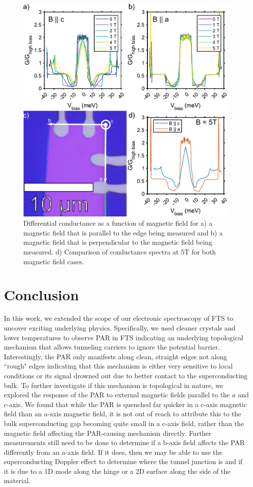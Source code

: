 \begin{figure}
    \centering
    \includegraphics[width = \textwidth]{Chap4/Figures/MagneticField.pdf}
    \caption{Differential conductance as a function of magnetic field for a) a magnetic field that is parallel to the edge being measured and b) a magnetic field that is perpendicular to the magnetic field being measured. d) Comparison of conductance spectra at 5T for both magnetic field cases.}
    \label{fig:PARField}
\end{figure}
\section{Conclusion}
In this work, we extended the scope of our electronic spectroscopy of \ac{FTS} to uncover exciting underlying physics. Specifically, we used cleaner crystals and lower temperatures to observe \acl{PAR} in \ac{FTS} indicating an underlying topological mechanism that allows tunneling carriers to ignore the potential barrier. Interestingly, the \ac{PAR} only manifests along clean, straight edges not along ``rough" edges indicating that this mechanism is either very sensitive to local conditions or its signal drowned out due to better contact to the superconducting bulk. To further investigate if this mechanism is topological in nature, we explored the response of the \ac{PAR} to external magnetic fields parallel to the $a$ and $c$-axis. We found that while the \ac{PAR} is quenched far quicker in a c-axis magnetic field than an a-axis magnetic field, it is not out of reach to attribute this to the bulk superconducting gap becoming quite small in a c-axis field, rather than the magnetic field affecting the \ac{PAR}-causing mechanism directly. Further measurements still need to be done to determine if a b-axis field affects the \ac{PAR} differently from an a-axis field. If it does, then we may be able to use the superconducting Doppler effect to determine where the tunnel junction is and if it is due to a 1D mode along the hinge or a 2D surface along the side of the material.